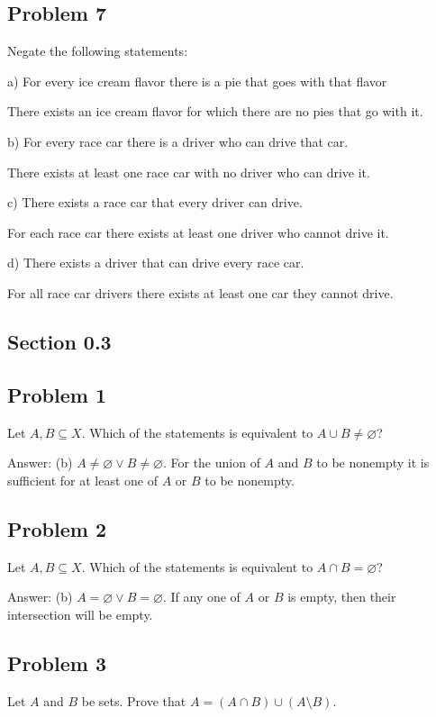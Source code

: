 \documentclass[11pt]{article}
\begin{document}
\subsection*{Problem 7}
Negate the following statements:

a) For every ice cream flavor there is a pie that goes with that flavor

There exists an ice cream flavor for which there are no pies that go with it.

b) For every race car there is a driver who can drive that car.

There exists at least one race car with no driver who can drive it.

c) There exists a race car that every driver can drive.

For each race car there exists at least one driver who cannot drive it.

d) There exists a driver that can drive every race car.

For all race car drivers there exists at least one car they cannot drive.

\subsection*{Section 0.3}
\subsection*{Problem 1}

Let $A, B \subseteq X$. Which of the statements is equivalent to 
$A \cup B \neq \varnothing $?

Answer: (b) $A \neq \varnothing \lor B \neq \varnothing $.
For the union of $A$ and $B$ to be nonempty it is sufficient for at least one of $A$ or $B$
to be nonempty.

\subsection*{Problem 2}

Let $A, B \subseteq X$. Which of the statements is equivalent to
$A \cap B = \varnothing $?

Answer: (b) $A = \varnothing \lor B = \varnothing$.
If any one of $A$ or $B$ is empty, then their intersection will be empty.

\subsection*{Problem 3}
Let $A$ and $B$ be sets. Prove that $A = (A \cap B) \cup (A \setminus B)$.
\end{document}
